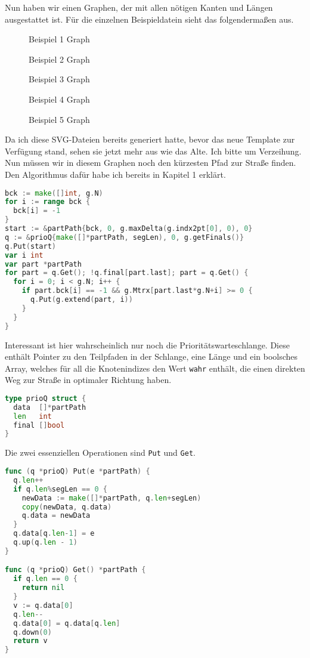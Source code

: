 \documentclass[a4paper,10pt,ngerman]{scrartcl}
\begin{document}
Nun haben wir einen Graphen, der mit allen nötigen Kanten und Längen ausgestattet ist. Für die einzelnen Beispieldatein sieht das folgenderma\ss en aus.
\begin{figure}[H]
  \def\svgwidth{\columnwidth} 
  
  \caption{Beispiel 1 Graph}
\end{figure}
\begin{figure}[H]
  \def\svgwidth{\columnwidth} 
  
  \caption{Beispiel 2 Graph}
\end{figure}
\begin{figure}[H]
  \def\svgwidth{\columnwidth} 
  
  \caption{Beispiel 3 Graph}
\end{figure}
\begin{figure}[H]
  \def\svgwidth{\columnwidth} 
  
  \caption{Beispiel 4 Graph}
\end{figure}
\begin{figure}[H]
  \def\svgwidth{\columnwidth} 
  
  \caption{Beispiel 5 Graph}
\end{figure}
Da ich diese SVG-Dateien bereits generiert hatte, bevor das neue Template zur Verfügung stand, sehen sie jetzt mehr aus wie das Alte. Ich bitte um Verzeihung. Nun müssen wir in diesem Graphen noch den kürzesten Pfad zur Stra\ss e finden. Den Algorithmus dafür habe ich bereits in Kapitel 1 erklärt.
\begin{lstlisting}[language=go]
bck := make([]int, g.N)
for i := range bck {
  bck[i] = -1
}
start := &partPath{bck, 0, g.maxDelta(g.indx2pt[0], 0), 0}
q := &prioQ{make([]*partPath, segLen), 0, g.getFinals()}
q.Put(start)
var i int
var part *partPath
for part = q.Get(); !q.final[part.last]; part = q.Get() {
  for i = 0; i < g.N; i++ {
    if part.bck[i] == -1 && g.Mtrx[part.last*g.N+i] >= 0 {
      q.Put(g.extend(part, i))
    }
  }
}
\end{lstlisting}
Interessant ist hier wahrscheinlich nur noch die Prioritätswarteschlange. Diese enthält Pointer zu den Teilpfaden in der Schlange, eine Länge und ein boolsches Array, welches für all die Knotenindizes den Wert \texttt{wahr} enthält, die einen direkten Weg zur Stra\ss e in optimaler Richtung haben.
\begin{lstlisting}[language=go]
type prioQ struct {
  data  []*partPath
  len   int
  final []bool
}
\end{lstlisting}
Die zwei essenziellen Operationen sind \texttt{Put} und \texttt{Get}. 
\begin{lstlisting}[language=go]
func (q *prioQ) Put(e *partPath) {
  q.len++
  if q.len%segLen == 0 {
    newData := make([]*partPath, q.len+segLen)
    copy(newData, q.data)
    q.data = newData
  }
  q.data[q.len-1] = e
  q.up(q.len - 1)
}

func (q *prioQ) Get() *partPath {
  if q.len == 0 {
    return nil
  }
  v := q.data[0]
  q.len--
  q.data[0] = q.data[q.len]
  q.down(0)
  return v
}
\end{lstlisting}
\end{document}
